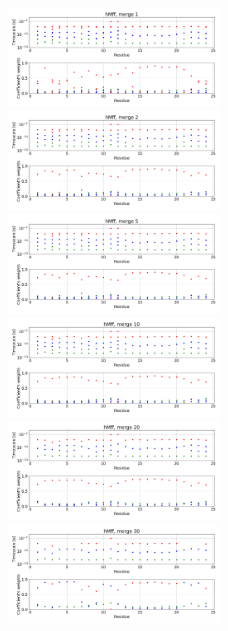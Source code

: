 \documentclass[12pt]{article}
\begin{document}
\begin{figure}
\centering
\includegraphics[width=0.5\textwidth]{hMff_1.png}
\includegraphics[width=0.5\textwidth]{hMff_2.png}
\includegraphics[width=0.5\textwidth]{hMff_5.png}
\includegraphics[width=0.5\textwidth]{hMff_10.png}
\includegraphics[width=0.5\textwidth]{hMff_20.png}
\includegraphics[width=0.5\textwidth]{hMff_30.png}
\end{figure}
\end{document}
